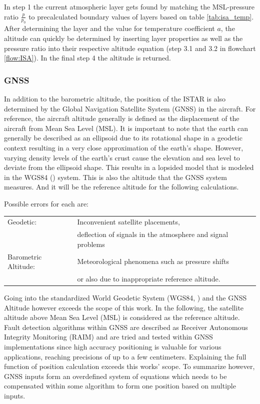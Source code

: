 In step 1 the current atmospheric layer gets found by matching the MSL-pressure ratio  $\frac{p}{p_0}$ to precalculated boundary values of layers based on table \ref{tab:isa_temp}. After determining the layer and the value for temperature coefficient $a$, the altitude can quickly be determined by inserting layer properties as well as the pressure ratio into their respective altitude equation (step 3.1 and 3.2 in flowchart \ref{flow:ISA}). In the final step 4 the altitude is returned.

\subsubsection{GNSS}
In addition to the barometric altitude, the position of the ISTAR is also determined by the Global Navigation Satellite System (GNSS) in the aircraft. For reference, the aircraft altitude generally is defined as the displacement of the aircraft from Mean Sea Level (MSL). It is important to note that the earth can generally be described as an ellipsoid due to its rotational shape in a geodetic context resulting in a very close approximation of the earth's shape. However, varying density levels of the earth's crust cause the elevation and sea level to deviate from the ellipsoid shape. This results in a lopsided model that is modeled in the WGS84 (\cite{schwarz_wgs_1998}) system. This is also the altitude that the GNSS system measures. And it will be the reference altitude for the following calculations.

Possible errors for each are:

\begin{tabular}[h]{ll}
    Geodetic:            & Inconvenient satellite placements,               \\ & deflection of signals in the atmosphere and signal problems \\
    Barometric Altitude: & Meteorological phenomena such as pressure shifts \\ & or also due to inappropriate reference altitude. \\
\end{tabular}

Going into the standardized World Geodetic System (WGS84, \cite{teunissen_springer_2017}) and the GNSS Altitude however exceeds the scope of this work. In the following, the satellite altitude above Mean Sea Level (MSL) is considered as the reference altitude. Fault detection algorithms within GNSS are described as Receiver Autonomous Integrity Monitoring (RAIM) and are tried and tested within GNSS implementations since high accuracy positioning is valuable for various applications, reaching precisions of up to a few centimeters. Explaining the full function of position calculation exceeds this works' scope. To summarize however, GNSS inputs form an overdefined system of equations which needs to be compensated within some algorithm to form one position based on multiple inputs. \cite{teunissen_springer_2017}

